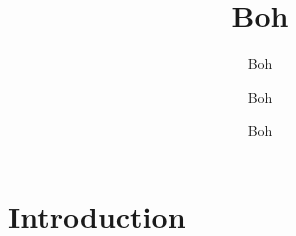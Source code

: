 \documentclass{beamer}
\title{Boh}
\subtitle{Boh}
\author{Boh}
\date{Boh}
\begin{document}
\maketitle

\section{Introduction}

\backmatter
\end{document}
